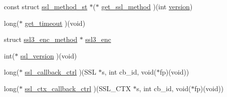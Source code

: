 \begin{DoxyCompactItemize}
\item 
const struct \hyperlink{structssl__method__st}{ssl\-\_\-method\-\_\-st} $\ast$($\ast$ \hyperlink{structssl__method__st_a3e4b5518d74dea04f3a834af9c49dbe6}{get\-\_\-ssl\-\_\-method} )(int \hyperlink{structssl__method__st_a1d231051899c943c03267d9ede6d2488}{version})
\item 
long($\ast$ \hyperlink{structssl__method__st_a448e415d96e9b0a5f5f3d49e50eb9aa4}{get\-\_\-timeout} )(void)
\item 
struct \hyperlink{structssl3__enc__method}{ssl3\-\_\-enc\-\_\-method} $\ast$ \hyperlink{structssl__method__st_aa9b5c4c60c391bc6771bd035aa10ce0a}{ssl3\-\_\-enc}
\item 
int($\ast$ \hyperlink{structssl__method__st_a49ddb57830dbd5357565521703cce6de}{ssl\-\_\-version} )(void)
\item 
long($\ast$ \hyperlink{structssl__method__st_ae06b89c1fdedc882823062374b095966}{ssl\-\_\-callback\-\_\-ctrl} )(S\-S\-L $\ast$s, int cb\-\_\-id, void($\ast$fp)(void))
\item 
long($\ast$ \hyperlink{structssl__method__st_a6b2c364ace489ef1953b2a5092612b0e}{ssl\-\_\-ctx\-\_\-callback\-\_\-ctrl} )(S\-S\-L\-\_\-\-C\-T\-X $\ast$s, int cb\-\_\-id, void($\ast$fp)(void))
\end{DoxyCompactItemize}



